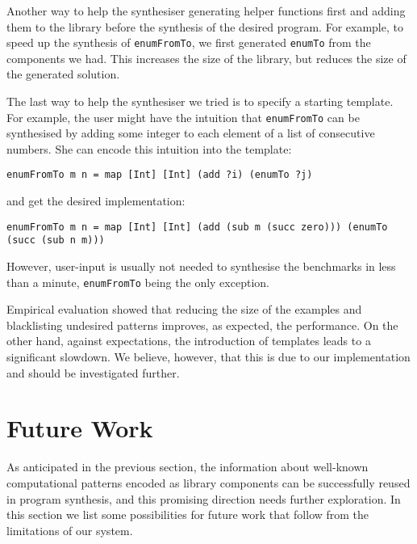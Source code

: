 Another way to help the synthesiser generating helper functions first and adding them to the library before the synthesis of the desired program. For example, to speed up the synthesis of \lstinline!enumFromTo!, we first generated \lstinline!enumTo! from the components we had. This increases the size of the library, but reduces the size of the generated solution.

The last way to help the synthesiser we tried is to specify a starting template. For example, the user might have the intuition that \lstinline!enumFromTo! can be synthesised by adding some integer to each element of a list of consecutive numbers. She can encode this intuition into the template:
\begin{lstlisting}[style=plain]
enumFromTo m n = map [Int] [Int] (add ?i) (enumTo ?j)
\end{lstlisting}
and get the desired implementation:
\begin{lstlisting}[style=plain]
enumFromTo m n = map [Int] [Int] (add (sub m (succ zero))) (enumTo (succ (sub n m)))
\end{lstlisting}
However, user-input is usually not needed to synthesise the benchmarks in less than a minute, \lstinline!enumFromTo! being the only exception.

Empirical evaluation showed that reducing the size of the examples and blacklisting undesired patterns improves, as expected, the performance. On the other hand, against expectations, the introduction of templates leads to a significant slowdown. We believe, however, that this is due to our implementation and should be investigated further.
  
\section{Future Work}

As anticipated in the previous section, the information about well-known computational patterns encoded as library components can be successfully reused in program synthesis, and this promising direction needs further exploration. In this section we list some possibilities for future work that follow from the limitations of our system.

